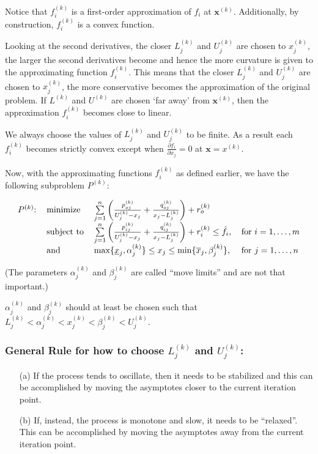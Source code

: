\documentclass[11pt]{article}
\begin{document}
Notice that $f_i^{(k)}$ is a first-order approximation of $f_i$ at $\mathbf{x}^{(k)}$. Additionally, by construction, $f_i^{(k)}$ is a {\color{tiananmen}convex function}.

Looking at the second derivatives, the closer $L_j^{(k)}$ and $U_j^{(k)}$ are chosen to $x_j^{(k)}$, the larger the second derivatives become and hence the more curvature is given to the approximating function $f_i^{(k)}$. This means that the closer $L_j^{(k)}$ and $U_j^{(k)}$ are chosen to $x_j^{(k)}$, the more conservative becomes the approximation of the original problem. If $L^{(k)}$ and $U^{(k)}$ are chosen `far away' from $\mathbf{x}^{(k)}$, then the approximation $f_i^{(k)}$ becomes close to linear.

We always choose the values of $L_j^{(k)}$ and $U_j^{(k)}$ to be finite. As a result each $f_i^{(k)}$ becomes strictly convex except when $\frac{\partial f_i}{\partial x_j}=0$ at $\mathbf{x}=x^{(k)}$.

Now, with the approximating functions $f_i^{(k)}$ as defined earlier, we have the following subproblem $P^{(k)}$:

{\color{baystate}
	\begin{equation}
		\begin{tabular}{llll}
			$P^{(k)}$: & minimize & $\sum\limits_{j=1}^{n}\left(\frac{p_{oj}^{(k)}}{U_j^{(k)}-x_j}+\frac{q_{oj}^{(k)}}{x_j-L_j^{(k)}}\right)+r_o^{(k)}$ &  \\
			& subject to & $\sum\limits_{j=1}^{n}\left(\frac{p_{ij}^{(k)}}{U_j^{(k)}-x_j}+\frac{q_{ij}^{(k)}}{x_j-L_j^{(k)}}\right)+r_i^{(k)}\leq\hat{f}_i$, & for $i=1,\ldots,m$ \\
			& and & $\max\lbrace\underline{x}_j,\alpha_j^{(k)}\rbrace\leq x_j\leq \min\lbrace \overline{x}_j,\beta_j^{(k)}\rbrace$, & for $j=1,\ldots,n$
		\end{tabular}
	\end{equation}
}

(The parameters $\alpha_j^{(k)}$ and $\beta_j^{(k)}$ are called ``{\color{tiananmen}move limits}'' and are not that important.)

$\alpha_j^{(k)}$ and $\beta_j^{(k)}$ should at least be chosen such that $L_j^{(k)}<\alpha_j^{(k)}<x_j^{(k)}<\beta_j^{(k)}<U_j^{(k)}$.

\subsubsection{General Rule for how to choose $L_j^{(k)}$ and $U_j^{(k)}$:}
\begin{itemize}
	\item[(a)] If the process tends to oscillate, then it needs to be stabilized and this can be accomplished by moving the asymptotes closer to the current iteration point.
	\item[(b)] If, instead, the process is monotone and slow, it needs to be ``relaxed''. This can be accomplished by moving the asymptotes away from the current iteration point.
\end{itemize}
\end{document}
